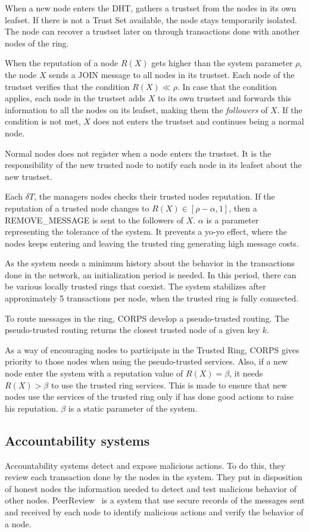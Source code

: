 When a new node enters the DHT, gathers a trustset from the nodes in its own
leafset. If there is not a Trust Set available, the node stays temporarily
isolated. The node can recover a trustset later on through transactions done with
another nodes of the ring.

When the reputation of a node $R(X)$ gets higher than the system parameter
$\rho$, the node $X$ sends a JOIN message to all nodes in its trustset. Each
node of the trustset verifies that the condition $R(X) \ll \rho$. In case that
the condition  applies, each node in the trustset adds $X$ to its own trustset
and forwards this information to all the nodes on its leafset, making them the
\textit{followers} of $X$.
If the condition is not met, $X$ does not enters the trustset and continues
being a normal node.

Normal nodes does not register when a node enters the trustset. It is the
responsibility of the new trusted node to notify each node in its leafset about
the new trustset.

Each $\delta T$, the managers nodes checks their trusted nodes reputation. If
the reputation of a trusted node changes to $R(X) \in [\rho -\alpha, 1]$, then
a REMOVE\_MESSAGE is sent to the followers of $X$. $\alpha$ is a parameter
representing the tolerance of the system. It prevents a yo-yo effect, where the nodes keeps entering and
leaving the trusted ring generating high message costs.

As the system needs a minimum history about the behavior in the transactions
done in the network, an initialization period is needed. In this period, there
can be various locally trusted rings that coexist. The system stabilizes after
approximately 5 transactions per node, when the trusted ring is fully connected.

To route messages in the ring, CORPS develop a pseudo-trusted routing. The
pseudo-trusted routing returns the closest trusted node of a given key $k$.

As a way of encouraging nodes to participate in the Trusted Ring, CORPS gives
priority to those nodes when using the pseudo-trusted services.
Also, if a new node enter the system with a reputation value of $R(X) =
\beta$, it needs $R(X) > \beta$ to use the trusted ring services. This is
made to ensure that new nodes use the services of the trusted ring only if has done
good actions to raise his reputation. $\beta$ is a static parameter of the
system. 


\subsection{Accountability systems}
Accountability systems detect and expose malicious actions.
To do this, they review each transaction done by the nodes in the system. They
put in disposition of honest nodes the information needed to detect and test
malicious behavior of other nodes. PeerReview~\cite{haeberlen2007peerreview} is a system that
use secure records of the messages sent and received by each node to identify
malicious actions and verify the behavior of a node.

